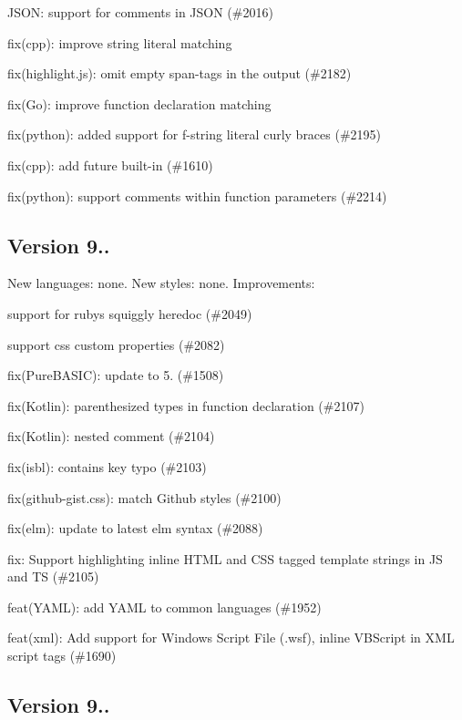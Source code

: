 \begin{DoxyItemize}
\item J\+S\+ON\+: support for comments in J\+S\+ON (\#2016)
\item fix(cpp)\+: improve string literal matching
\item fix(highlight.\+js)\+: omit empty span-\/tags in the output (\#2182)
\item fix(\+Go)\+: improve function declaration matching
\item fix(python)\+: added support for f-\/string literal curly braces (\#2195)
\item fix(cpp)\+: add {\ttfamily future} built-\/in (\#1610)
\item fix(python)\+: support comments within function parameters (\#2214)
\end{DoxyItemize}

\subsection*{Version 9..}

New languages\+: none. New styles\+: none. Improvements\+:
\begin{DoxyItemize}
\item support for ruby\textquotesingle{}s squiggly heredoc (\#2049)
\item support css custom properties (\#2082)
\item fix(\+Pure\+B\+A\+S\+I\+C)\+: update to 5. (\#1508)
\item fix(\+Kotlin)\+: parenthesized types in function declaration (\#2107)
\item fix(\+Kotlin)\+: nested comment (\#2104)
\item fix(isbl)\+: contains key typo (\#2103)
\item fix(github-\/gist.\+css)\+: match Github styles (\#2100)
\item fix(elm)\+: update to latest elm syntax (\#2088)
\item fix\+: Support highlighting inline H\+T\+ML and C\+SS tagged template strings in JS and TS (\#2105)
\item feat(\+Y\+A\+M\+L)\+: add Y\+A\+ML to common languages (\#1952)
\item feat(xml)\+: Add support for Windows Script File (.wsf), inline V\+B\+Script in X\+ML {\ttfamily script} tags (\#1690)
\end{DoxyItemize}

\subsection*{Version 9..}

